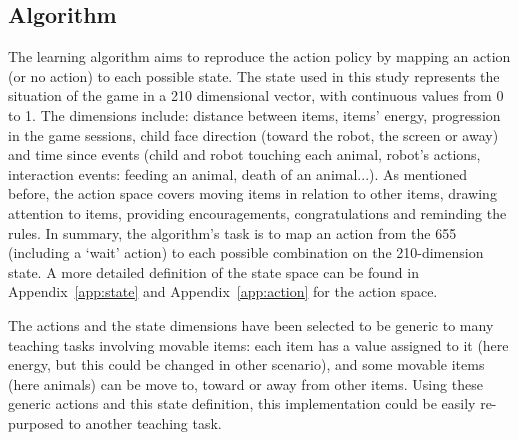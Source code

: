 \subsection{Algorithm}

The learning algorithm aims to reproduce the action policy by mapping an action (or no action) to each possible state. The state used in this study represents the situation of the game in a 210 dimensional vector, with continuous values from 0 to 1. The dimensions include: distance between items, items' energy, progression in the game sessions, child face direction (toward the robot, the screen or away) and time since events (child and robot touching each animal, robot's actions, interaction events: feeding an animal, death of an animal...). As mentioned before, the action space covers moving items in relation to other items, drawing attention to items, providing encouragements, congratulations and reminding the rules. In summary, the algorithm's task is to map an action from the 655 (including a `wait' action) to each possible combination on the 210-dimension state. A more detailed definition of the state space can be found in Appendix~\ref{app:state} and Appendix~\ref{app:action} for the action space.

The actions and the state dimensions have been selected to be generic to many teaching tasks involving movable items: each item has a value assigned to it (here energy, but this could be changed in other scenario), and some movable items (here animals) can be move to, toward or away from other items. Using these generic actions and this state definition, this implementation could be easily re-purposed to another teaching task.

